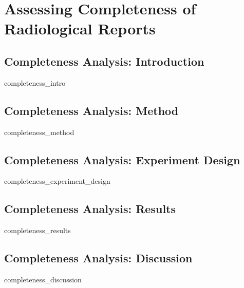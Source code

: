 \chapter{Assessing Completeness of Radiological Reports}

\section{Completeness Analysis: Introduction}
{completeness_intro}
\clearpage

\section{Completeness Analysis: Method}
{completeness_method}
\clearpage

\section{Completeness Analysis: Experiment Design}
{completeness_experiment_design}
\clearpage

\section{Completeness Analysis: Results}
{completeness_results}
\clearpage

\section{Completeness Analysis: Discussion}
{completeness_discussion}